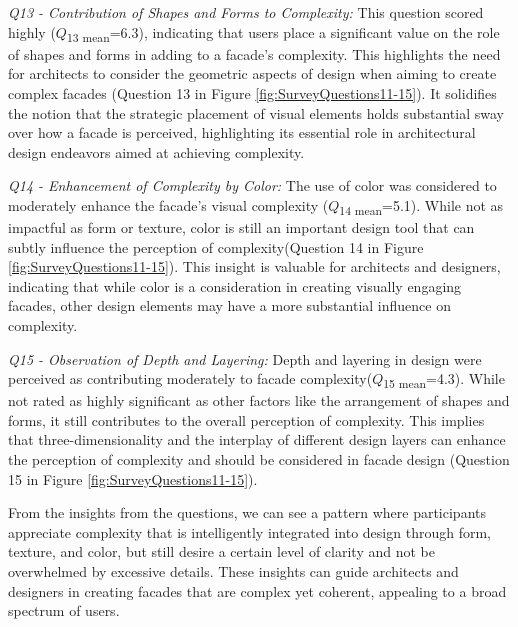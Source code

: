 \textit{Q13 - Contribution of Shapes and Forms to Complexity:}
This question scored highly (\(Q\)\textsubscript{\small{13 mean}}=6.3), indicating that users place a significant value on the role of shapes and forms in adding to a facade's complexity.
This highlights the need for architects to consider the geometric aspects of design when aiming to create complex facades (Question 13 in Figure \ref{fig:SurveyQuestions11-15}). It solidifies the notion that the strategic placement of visual elements holds substantial sway over how a facade is perceived, highlighting its essential role in architectural design endeavors aimed at achieving complexity.

\textit{Q14 - Enhancement of Complexity by Color:}
The use of color was considered to moderately enhance the facade's visual complexity (\(Q\)\textsubscript{\small{14 mean}}=5.1).
While not as impactful as form or texture, color is still an important design tool that can subtly influence the perception of complexity(Question 14 in Figure \ref{fig:SurveyQuestions11-15}).
This insight is valuable for architects and designers, indicating that while color is a consideration in creating visually engaging facades, other design elements may have a more substantial influence on complexity.

\textit{Q15 - Observation of Depth and Layering:}
Depth and layering in design were perceived as contributing moderately to facade complexity(\(Q\)\textsubscript{\small{15 mean}}=4.3).
While not rated as highly significant as other factors like the arrangement of shapes and forms, it still contributes to the overall perception of complexity.
This implies that three-dimensionality and the interplay of different design layers can enhance the perception of complexity and should be considered in facade design (Question 15 in Figure \ref{fig:SurveyQuestions11-15}).

From the insights from the questions, we can see a pattern where participants appreciate complexity that is intelligently integrated into design through form, texture, and color, but still desire a certain level of clarity and not be overwhelmed by excessive details.
These insights can guide architects and designers in creating facades that are complex yet coherent, appealing to a broad spectrum of users.

